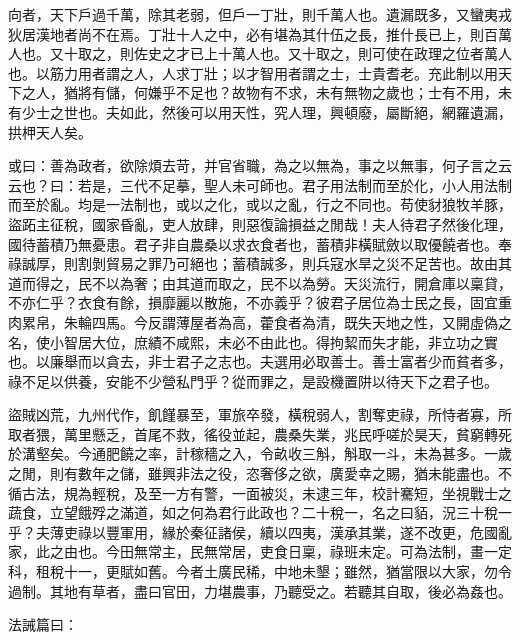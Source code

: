 \begin{pinyinscope}
向者，天下戶過千萬，除其老弱，但戶一丁壯，則千萬人也。遺漏既多，又蠻夷戎狄居漢地者尚不在焉。丁壯十人之中，必有堪為其什伍之長，推什長已上，則百萬人也。又十取之，則佐史之才已上十萬人也。又十取之，則可使在政理之位者萬人也。以筋力用者謂之人，人求丁壯；以才智用者謂之士，士貴耆老。充此制以用天下之人，猶將有儲，何嫌乎不足也？故物有不求，未有無物之歲也；士有不用，未有少士之世也。夫如此，然後可以用天性，究人理，興頓廢，屬斷絕，網羅遺漏，拱柙天人矣。

或曰：善為政者，欲除煩去苛，并官省職，為之以無為，事之以無事，何子言之云云也？曰：若是，三代不足摹，聖人未可師也。君子用法制而至於化，小人用法制而至於亂。均是一法制也，或以之化，或以之亂，行之不同也。苟使豺狼牧羊豚，盜跖主征稅，國家昏亂，吏人放肆，則惡復論損益之閒哉！夫人待君子然後化理，國待蓄積乃無憂患。君子非自農桑以求衣食者也，蓄積非橫賦斂以取優饒者也。奉祿誠厚，則割剝貿易之罪乃可絕也；蓄積誠多，則兵寇水旱之災不足苦也。故由其道而得之，民不以為奢；由其道而取之，民不以為勞。天災流行，開倉庫以稟貸，不亦仁乎？衣食有餘，損靡麗以散施，不亦義乎？彼君子居位為士民之長，固宜重肉累帛，朱輪四馬。今反謂薄屋者為高，藿食者為清，既失天地之性，又開虛偽之名，使小智居大位，庶績不咸熙，未必不由此也。得拘絜而失才能，非立功之實也。以廉舉而以貪去，非士君子之志也。夫選用必取善士。善士富者少而貧者多，祿不足以供養，安能不少營私門乎？從而罪之，是設機置阱以待天下之君子也。

盜賊凶荒，九州代作，飢饉暴至，軍旅卒發，橫稅弱人，割奪吏祿，所恃者寡，所取者猥，萬里懸乏，首尾不救，徭役並起，農桑失業，兆民呼嗟於昊天，貧窮轉死於溝壑矣。今通肥饒之率，計稼穡之入，令畝收三斛，斛取一斗，未為甚多。一歲之閒，則有數年之儲，雖興非法之役，恣奢侈之欲，廣愛幸之賜，猶未能盡也。不循古法，規為輕稅，及至一方有警，一面被災，未逮三年，校計騫短，坐視戰士之蔬食，立望餓殍之滿道，如之何為君行此政也？二十稅一，名之曰貊，況三十稅一乎？夫薄吏祿以豐軍用，緣於秦征諸侯，續以四夷，漢承其業，遂不改更，危國亂家，此之由也。今田無常主，民無常居，吏食日稟，祿班未定。可為法制，畫一定科，租稅十一，更賦如舊。今者土廣民稀，中地未墾；雖然，猶當限以大家，勿令過制。其地有草者，盡曰官田，力堪農事，乃聽受之。若聽其自取，後必為姦也。

法誡篇曰：


\end{pinyinscope}
